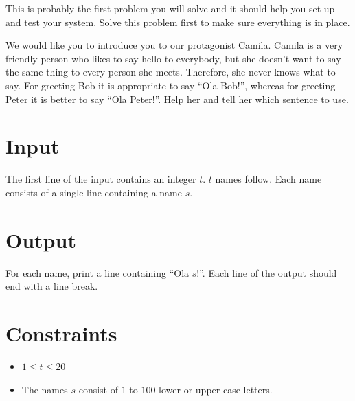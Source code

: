 
This is probably the first problem you will solve and it should help you set up and test your system. Solve this problem first to make sure everything is in place.

We would like you to introduce you to our protagonist Camila.
Camila is a very friendly person who likes to say hello to everybody, but she doesn't want to say the same thing to every person she meets.
Therefore, she never knows what to say.
For greeting Bob it is appropriate to say ``Ola Bob!'', whereas for greeting Peter it is better to say ``Ola Peter!''.
Help her and tell her which sentence to use.

\section*{Input}
The first line of the input contains an integer $t$.
$t$ names follow.
Each name consists of a single line containing a name $s$.

\section*{Output}
For each name, print a line containing ``Ola $s$!''.
Each line of the output should end with a line break.

\section*{Constraints}
\begin{itemize}
	\item $1\leq t\leq 20$
	\item The names $s$ consist of $1$ to $100$ lower or upper case letters.
\end{itemize}
